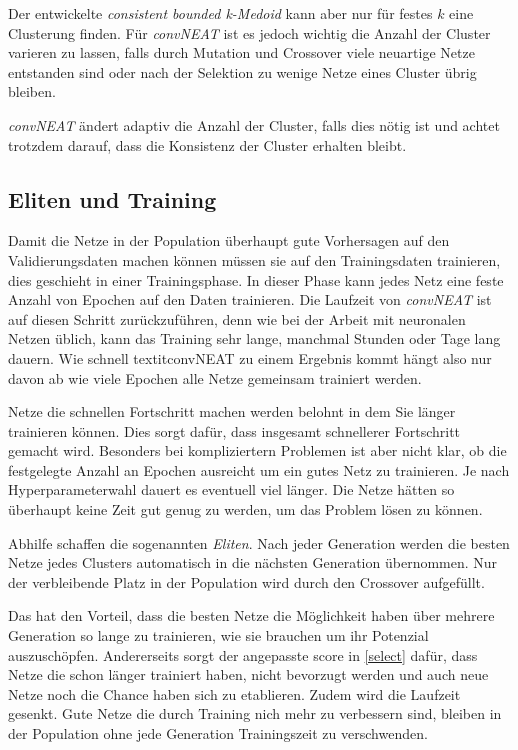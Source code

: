 \documentclass[]{scrartcl}
\begin{document}
				Der entwickelte \textit{consistent bounded k-Medoid} kann aber nur für festes $k$ eine Clusterung finden.
				Für \textit{convNEAT} ist es jedoch wichtig die Anzahl der Cluster varieren zu lassen, falls durch Mutation und Crossover viele
				neuartige Netze entstanden sind oder nach der Selektion zu wenige Netze eines Cluster übrig bleiben.

				\textit{convNEAT} ändert adaptiv die Anzahl der Cluster, falls dies nötig ist und achtet trotzdem darauf, dass die Konsistenz der Cluster erhalten bleibt.



		\subsection{Eliten und Training}
			
			Damit die Netze in der Population überhaupt gute Vorhersagen auf den Validierungsdaten machen können müssen sie auf den Trainingsdaten trainieren, dies geschieht in einer Trainingsphase.
			In dieser Phase kann jedes Netz eine feste Anzahl von Epochen auf den Daten trainieren. Die Laufzeit von \textit{convNEAT} ist auf diesen Schritt zurückzuführen, denn 
			wie bei der Arbeit mit neuronalen Netzen üblich, kann das Training sehr lange, manchmal Stunden oder Tage lang dauern.
			Wie schnell textit{convNEAT} zu einem Ergebnis kommt hängt also nur davon ab wie viele Epochen alle Netze gemeinsam trainiert werden.

			Netze die schnellen Fortschritt machen werden belohnt in dem Sie länger trainieren können. Dies sorgt dafür, dass insgesamt schnellerer Fortschritt gemacht wird.
			Besonders bei kompliziertern Problemen ist aber nicht klar, ob die festgelegte Anzahl an Epochen ausreicht um ein gutes Netz zu trainieren.
			Je nach Hyperparameterwahl dauert es eventuell viel länger. Die Netze hätten so überhaupt keine Zeit gut genug zu werden, um das Problem lösen zu können.

			Abhilfe schaffen die sogenannten \textit{Eliten}. Nach jeder Generation werden die besten Netze jedes Clusters automatisch in die nächsten Generation übernommen.
			Nur der verbleibende Platz in der Population wird durch den Crossover aufgefüllt.

			Das hat den Vorteil, dass die besten Netze die Möglichkeit haben über mehrere Generation so lange zu trainieren, wie sie brauchen um ihr Potenzial auszuschöpfen.
			Andererseits sorgt der angepasste score in \ref{select} dafür, dass Netze die schon länger trainiert haben, nicht bevorzugt werden und auch neue Netze noch die Chance haben
			sich zu etablieren. Zudem wird die Laufzeit gesenkt. Gute Netze die durch Training nich mehr zu verbessern sind, bleiben in der Population ohne jede Generation
			Trainingszeit zu verschwenden.
	
\end{document}
